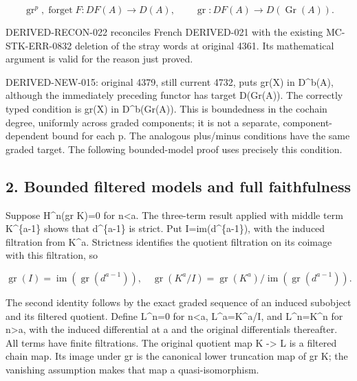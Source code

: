\documentclass[11pt]{article}
\begin{document}
\[
 \operatorname{gr}^p,\operatorname{forget}F:DF(A)\longrightarrow D(A),
 \qquad \operatorname{gr}:DF(A)\longrightarrow D(\operatorname{Gr}(A)).
\]

DERIVED-RECON-022 reconciles French DERIVED-021 with the existing MC-STK-ERR-0832 deletion of the stray words at original 4361. Its mathematical argument is valid for the reason just proved.

DERIVED-NEW-015:\allowbreak{} original 4379,\allowbreak{} still current 4732,\allowbreak{} puts gr(X)\allowbreak{} in D\textasciicircum{}b(A)\allowbreak{},\allowbreak{} although the immediately preceding functor has target D(Gr(A)\allowbreak{})\allowbreak{}. The correctly typed condition is gr(X)\allowbreak{} in D\textasciicircum{}b(Gr(A)\allowbreak{})\allowbreak{}. This is boundedness in the cochain degree,\allowbreak{} uniformly across graded components; it is not a separate,\allowbreak{} component-dependent bound for each p. The analogous plus/\allowbreak{}minus conditions have the same graded target. The following bounded-model proof uses precisely this condition.

\subsection{2. Bounded filtered models and full faithfulness}\label{proofs-4166-5089-bounded-filtered-models-and-full-faithfulness}

Suppose H\^{}n(gr K)\allowbreak{}\allowbreak{}=0 for n\textless a. The three-term result applied with middle term K\^{}\{a-1\} shows that d\^{}\{a-1\} is strict. Put I\allowbreak{}=im(d\textasciicircum{}\{a-1\})\allowbreak{},\allowbreak{} with the induced filtration from K\^{}a. Strictness identifies the quotient filtration on its coimage with this filtration,\allowbreak{} so

\[
 \operatorname{gr}(I)=\operatorname{im}(\operatorname{gr}(d^{a-1})),
 \quad
 \operatorname{gr}(K^a/I)=
 \operatorname{gr}(K^a)/\operatorname{im}(\operatorname{gr}(d^{a-1})).
\]

The second identity follows by the exact graded sequence of an induced subobject and its filtered quotient. Define L\textasciicircum{}n\allowbreak{}=0 for n<a,\allowbreak{} L\textasciicircum{}a\allowbreak{}=K\textasciicircum{}a/\allowbreak{}I,\allowbreak{} and L\textasciicircum{}n\allowbreak{}=K\textasciicircum{}n for n>a,\allowbreak{} with the induced differential at a and the original differentials thereafter. All terms have finite filtrations. The original quotient map K \allowbreak{}-> L is a filtered chain map. Its image under gr is the canonical lower truncation map of gr K; the vanishing assumption makes that map a quasi-isomorphism.
\end{document}
